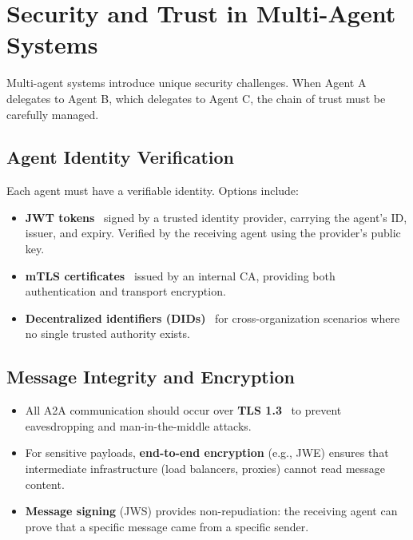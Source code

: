 \section{Security and Trust in Multi-Agent Systems}
\label{sec:a2a:security}

Multi-agent systems introduce unique security challenges. When Agent A delegates to Agent B, which delegates to Agent C, the chain of trust must be carefully managed.

\subsection{Agent Identity Verification}
\label{agent-identity-verification}

Each agent must have a verifiable identity. Options include:

\begin{itemize}
  \item \textbf{JWT tokens}~\cite{rfc7519} signed by a trusted identity provider, carrying the agent’s ID, issuer, and expiry. Verified by the receiving agent using the provider’s public key.
  \item \textbf{mTLS certificates}~\cite{rfc8705} issued by an internal CA, providing both authentication and transport encryption.
  \item \textbf{Decentralized identifiers (DIDs)}~\cite{w3c-did-2022} for cross-organization scenarios where no single trusted authority exists.
\end{itemize}

\subsection{Message Integrity and Encryption}
\label{message-integrity-and-encryption}

\begin{itemize}
  \item All A2A communication should occur over \textbf{TLS 1.3}~\cite{rfc8446} to prevent eavesdropping and man-in-the-middle attacks.
  \item For sensitive payloads, \textbf{end-to-end encryption} (e.g., JWE) ensures that intermediate infrastructure (load balancers, proxies) cannot read message content.
  \item \textbf{Message signing} (JWS) provides non-repudiation: the receiving agent can prove that a specific message came from a specific sender.
\end{itemize}

